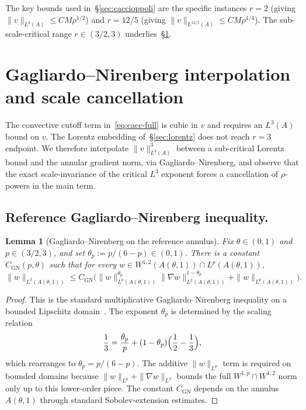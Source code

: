 \documentclass[11pt]{amsart}
\newtheorem{lemma}[theorem]{Lemma}
\theoremstyle{definition}
\newcommand{\norm}[1]{\|#1\|}
\begin{document}
The key bounds used in~\S\ref{sec:caccioppoli} are the specific
instances $r = 2$ (giving $\norm{v}_{L^2(A)} \leq CM\rho^{1/2}$)
and $r = 12/5$ (giving $\norm{v}_{L^{12/5}(A)} \leq
CM\rho^{1/4}$). The sub-scale-critical range $r \in (3/2, 3)$
underlies~\S\ref{sec:gn}.

\section{Gagliardo--Nirenberg interpolation and scale cancellation}
\label{sec:gn}

The convective cutoff term in~\eqref{eq:cacc-full} is cubic in
$v$ and requires an $L^3(A)$ bound on $v$. The Lorentz embedding
of~\S\ref{sec:lorentz} does not reach $r = 3$ endpoint. We
therefore interpolate $\norm{v}_{L^3(A)}^3$ between a
sub-critical Lorentz bound and the annular gradient norm, via
Gagliardo--Nirenberg, and observe that the exact scale-invariance
of the critical $L^3$ exponent forces a cancellation of
$\rho$-powers in the main term.

\subsection{Reference Gagliardo--Nirenberg inequality.}

\begin{lemma}[Gagliardo--Nirenberg on the reference annulus]
\label{lem:GN-ref}
Fix $\theta \in (0, 1)$ and $p \in (3/2, 3)$, and set $\theta_p :=
p/(6 - p) \in (0, 1)$. There is a constant $C_{\mathrm{GN}}(p, \theta)$ such
that for every $w \in W^{1,2}(A(\theta, 1)) \cap L^p(A(\theta, 1))$,
\begin{equation}\label{eq:GN-ref}
\norm{w}_{L^3(A(\theta,1))} \leq C_{\mathrm{GN}}\bigl(
\norm{w}_{L^p(A(\theta,1))}^{\theta_p}
\norm{\nabla w}_{L^2(A(\theta,1))}^{1 - \theta_p}
+ \norm{w}_{L^p(A(\theta,1))} \bigr).
\end{equation}
\end{lemma}

\begin{proof}
This is the standard multiplicative Gagliardo--Nirenberg
inequality on a bounded Lipschitz domain~\cite[Thm~II.5.2]{Galdi}.
The exponent $\theta_p$ is determined by the scaling relation
\[
\frac{1}{3} = \frac{\theta_p}{p} + (1 - \theta_p)\Bigl(\frac{1}{2} - \frac{1}{3}\Bigr),
\]
which rearranges to $\theta_p = p/(6 - p)$. The additive
$\norm{w}_{L^p}$ term is required on bounded domains because
$\norm{w}_{L^p} + \norm{\nabla w}_{L^2}$ bounds the full
$W^{1,p} \cap W^{1,2}$ norm only up to this lower-order piece.
The constant $C_{\mathrm{GN}}$ depends on the annulus $A(\theta, 1)$ through
standard Sobolev-extension estimates.
\end{proof}
\end{document}
